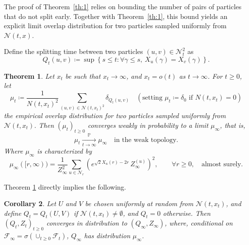 \documentclass{article}
\newtheorem{theorem}{Theorem}[section]
\newtheorem{corollary}[theorem]{Corollary}
\begin{document}
The proof of Theorem~\ref{th:1} relies on bounding the number of pairs of particles that do not split early. Together with Theorem~\ref{th:1}, this bound yields an explicit limit overlap distribution for two particles sampled uniformly from \( \mathcal{N}(t, x) \).


Define the splitting time between two particles \( (u,v)\in \mathcal{N}_t^2 \) as
\[
    Q_t(u, v) \coloneqq \sup \left\{ s \leq t : \forall \gamma \leq s,\ X_u(\gamma) = X_v(\gamma) \right\}.
\]

\begin{theorem}\label{thm:ut}
     Let \( x_t \) be such that \( x_t \to \infty \), and \( x_t = o(t) \) as \( t \to \infty \). For $t\geq 0$, let
     \begin{equation}
         \mu_t \coloneqq \frac{1}{N(t,x_t)^2}\sum_{(u,v)\in \mathcal{N}(t,x_t)^2}\delta_{Q_t(u,v)} \quad (\text{setting } \mu_t \coloneqq \delta_0 \text{ if } N(t,x_t) = 0)
     \end{equation}
     the empirical overlap distribution for two particles sampled uniformly from $\mathcal{N}(t,x_t)$. Then $(\mu_t)_{t\ge0}$ converges weakly in probability to a limit $\mu_\infty$, that is,
    \begin{equation}
    \mu_t \xrightarrow[t\to\infty]{\mathbb{P}} \mu_\infty
    \quad \text{in the weak topology}.
    \end{equation}
    Where $\mu_\infty$ is characterized by 
    \begin{equation}
    \mu_\infty([r,\infty))
    =\frac{1}{Z_\infty^2}
    \sum_{u\in\mathcal{N}_r}
    \left(e^{\sqrt{2}X_u(r)-2r}\,Z_\infty^{(u)}\right)^2,
    \qquad \forall r\ge0,
    \quad \text{almost surely.}
    \end{equation}
\end{theorem}
Theorem \ref{thm:ut} directly implies the following.
\begin{corollary}
Let \( U \) and \( V \) be chosen uniformly at random from \( \mathcal{N}(t, x_t) \), and define \( Q_t = Q_t(U, V) \) if \( \mathcal{N}(t, x_t) \neq \emptyset \), and \( Q_t = 0 \) otherwise. Then \( (Q_t,Z_t)_{t \ge 0} \) converges in distribution to \( (Q_\infty,Z_\infty)\), where, conditional on $\mathcal{F}_\infty = \sigma\left(\cup_{t \ge 0} \mathcal{F}_t\right)$, $Q_\infty$ has distribution $\mu_\infty$.
\end{corollary}
\end{document}
